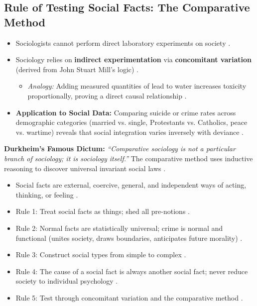 \subsection{Rule of Testing Social Facts: The Comparative Method}
\begin{itemize}
    \item Sociologists cannot perform direct laboratory experiments on society .
    \item Sociology relies on \textbf{indirect experimentation} via \textbf{concomitant variation} (derived from John Stuart Mill's logic) .
    \begin{itemize}
        \item \textit{Analogy:} Adding measured quantities of lead to water increases toxicity proportionally, proving a direct causal relationship .
    \end{itemize}
    \item \textbf{Application to Social Data:} Comparing suicide or crime rates across demographic categories (married vs. single, Protestants vs. Catholics, peace vs. wartime) reveals that social integration varies inversely with deviance .
\end{itemize}

\begin{KeyConcept}
\textbf{Durkheim's Famous Dictum:} \textit{``Comparative sociology is not a particular branch of sociology; it is sociology itself.''}  The comparative method uses inductive reasoning to discover universal invariant social laws .
\end{KeyConcept}

\begin{QuickRevision}
\begin{itemize}
    \item Social facts are external, coercive, general, and independent ways of acting, thinking, or feeling .
    \item Rule 1: Treat social facts as things; shed all pre-notions .
    \item Rule 2: Normal facts are statistically universal; crime is normal and functional (unites society, draws boundaries, anticipates future morality) .
    \item Rule 3: Construct social types from simple to complex .
    \item Rule 4: The cause of a social fact is always another social fact; never reduce society to individual psychology .
    \item Rule 5: Test through concomitant variation and the comparative method .
\end{itemize}
\end{QuickRevision}

